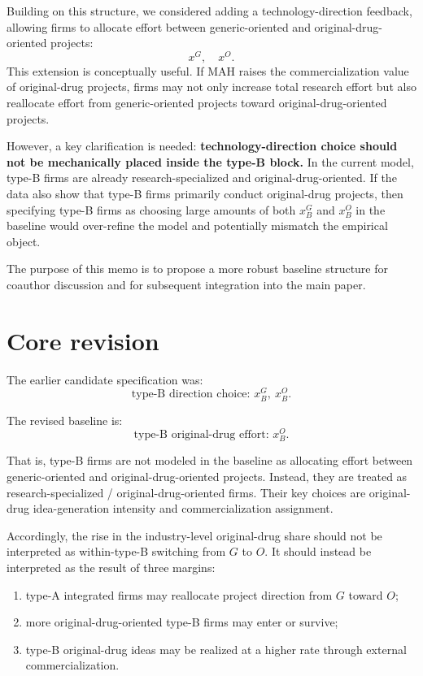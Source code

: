\documentclass[12pt]{article}
\begin{document}
Building on this structure, we considered adding a technology-direction feedback, allowing firms to allocate effort between generic-oriented and original-drug-oriented projects:
\[
x^G,\quad x^O.
\]
This extension is conceptually useful. If MAH raises the commercialization value of original-drug projects, firms may not only increase total research effort but also reallocate effort from generic-oriented projects toward original-drug-oriented projects.

However, a key clarification is needed: \textbf{technology-direction choice should not be mechanically placed inside the type-B block.} In the current model, type-B firms are already research-specialized and original-drug-oriented. If the data also show that type-B firms primarily conduct original-drug projects, then specifying type-B firms as choosing large amounts of both $x_B^G$ and $x_B^O$ in the baseline would over-refine the model and potentially mismatch the empirical object.

The purpose of this memo is to propose a more robust baseline structure for coauthor discussion and for subsequent integration into the main paper.

\section{Core revision}

The earlier candidate specification was:
\[
\text{type-B direction choice: } x_B^G,\ x_B^O.
\]

The revised baseline is:
\[
\text{type-B original-drug effort: } x_B^O.
\]

That is, type-B firms are not modeled in the baseline as allocating effort between generic-oriented and original-drug-oriented projects. Instead, they are treated as research-specialized / original-drug-oriented firms. Their key choices are original-drug idea-generation intensity and commercialization assignment.

Accordingly, the rise in the industry-level original-drug share should not be interpreted as within-type-B switching from $G$ to $O$. It should instead be interpreted as the result of three margins:
\begin{enumerate}
    \item type-A integrated firms may reallocate project direction from $G$ toward $O$;
    \item more original-drug-oriented type-B firms may enter or survive;
    \item type-B original-drug ideas may be realized at a higher rate through external commercialization.
\end{enumerate}
\end{document}
